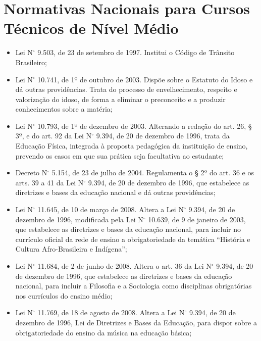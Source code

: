 \documentclass[
	12pt,				%
	openright,			%
	twoside,			%
	a4paper,			%
	chapter=TITLE,		%
	english,			%
	french,				%
	spanish,			%
	brazil,				%
	]{abntex2}
\newcommand{\nord}[1]{N$^\circ$ #1}
\begin{document}
\section{Normativas Nacionais para Cursos Técnicos de Nível Médio}

\begin{itemize}
    
   \item Lei \nord{9.503}, de 23 de setembro de 1997. Institui o Código de Trânsito Brasileiro;

   \item Lei \nord{10.741}, de 1º de outubro de 2003. Dispõe sobre o Estatuto do Idoso e dá outras
providências. Trata do processo de envelhecimento, respeito e valorização do idoso, de
forma a eliminar o preconceito e a produzir conhecimentos sobre a matéria;

   \item Lei \nord{10.793}, de 1º de dezembro de 2003. Alterando a redação do art. 26, § 3º, e do art. 92
da Lei \nord{9.394}, de 20 de dezembro de 1996, trata da Educação Física, integrada à proposta
pedagógica da instituição de ensino, prevendo os casos em que sua prática seja facultativa
ao estudante;

   \item Decreto \nord{5.154}, de 23 de julho de 2004. Regulamenta o § 2º do art. 36 e os arts. 39 a 41 da
Lei \nord{9.394}, de 20 de dezembro de 1996, que estabelece as diretrizes e bases da educação
nacional e dá outras providências;

   \item Lei \nord{11.645}, de 10 de março de 2008. Altera a Lei \nord{9.394}, de 20 de dezembro de 1996,
modificada pela Lei \nord{10.639}, de 9 de janeiro de 2003, que estabelece as diretrizes e bases
da educação nacional, para incluir no currículo oficial da rede de ensino a obrigatoriedade
da temática  ``História e Cultura Afro-Brasileira e Indígena'';

   \item Lei \nord{11.684}, de 2 de junho de 2008. Altera o art. 36 da Lei \nord{9.394}, de 20 de dezembro de
1996, que estabelece as diretrizes e bases da educação nacional, para incluir a Filosofia e a
Sociologia como disciplinas obrigatórias nos currículos do ensino médio;

   \item Lei \nord{11.769}, de 18 de agosto de 2008. Altera a Lei \nord{9.394}, de 20 de dezembro de 1996,
Lei de Diretrizes e Bases da Educação, para dispor sobre a obrigatoriedade do ensino da
música na educação básica;


\end{itemize}
\end{document}
